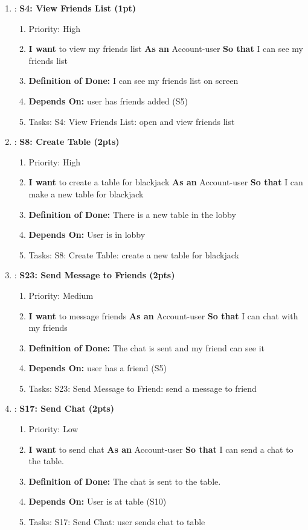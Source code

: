\begin{enumerate}[nosep]
    \item: \textbf{S4: View Friends List (1pt)}
    \begin{enumerate}[nosep]
        \item Priority: High 
        \item \textbf{I want} to view my friends list \textbf{As an} Account-user \textbf{So that} I can see my friends list
        \item \textbf{Definition of Done:} I can see my friends list on screen
        \item \textbf{Depends On:} user has friends added (S5)
        \item Tasks: S4: View Friends List: open and view friends list
    \end{enumerate}

    \item: \textbf{S8: Create Table (2pts)}
    \begin{enumerate}[nosep]
        \item Priority: High 
        \item \textbf{I want} to create a table for blackjack \textbf{As an} Account-user \textbf{So that} I can make a new table for blackjack
        \item \textbf{Definition of Done:} There is a new table in the lobby
        \item \textbf{Depends On:} User is in lobby
        \item Tasks: S8: Create Table: create a new table for blackjack
    \end{enumerate}

    \item: \textbf{S23: Send Message to Friends (2pts)}
    \begin{enumerate}[nosep]
        \item Priority: Medium
        \item \textbf{I want} to message friends \textbf{As an} Account-user \textbf{So that} I can chat with my friends
        \item \textbf{Definition of Done:} The chat is sent and my friend can see it
        \item \textbf{Depends On:} user has a friend (S5)
        \item Tasks: S23: Send Message to Friend: send a message to friend
    \end{enumerate}

    \item: \textbf{S17: Send Chat (2pts)}
    \begin{enumerate}[nosep]
        \item Priority: Low
        \item \textbf{I want} to send chat \textbf{As an} Account-user \textbf{So that} I can send a chat to the table.
        \item \textbf{Definition of Done:} The chat is sent to the table.
        \item \textbf{Depends On:} User is at table (S10)
        \item Tasks: S17: Send Chat: user sends chat to table
    \end{enumerate}


\end{enumerate}
